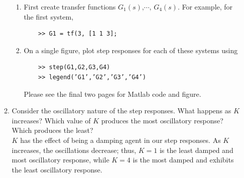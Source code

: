 \documentclass[11pt]{article}
\begin{document}
\begin{enumerate}
\begin{enumerate}
        \begin{enumerate}
            \item First create transfer functions \(G_1(s)\text{,} \cdots\text{, } G_4(s)\). For example, for the first system,
\begin{verbatim}
    >> G1 = tf(3, [1 1 3];
\end{verbatim}
            \item On a single figure, plot step responses for each of these systems using
\begin{verbatim}
    >> step(G1,G2,G3,G4)
    >> legend(’G1’,’G2’,’G3’,’G4’)
\end{verbatim}
        Please see the final two pages for Matlab code and figure.
        \end{enumerate}
        \item Consider the oscillatory nature of the step responses. What happens as \(K\) increases? Which value of \(K\) produces the most oscillatory response? Which produces the least?\\[1em]
        \(K\) has the effect of being a damping agent in our step responses. As \(K\) increases, the oscillations decrease; thus, \(K=1\) is the least damped and most oscillatory response, while \(K=4\) is the most damped and exhibits the least oscillatory response.
    \end{enumerate}
\end{enumerate}

\end{document}
